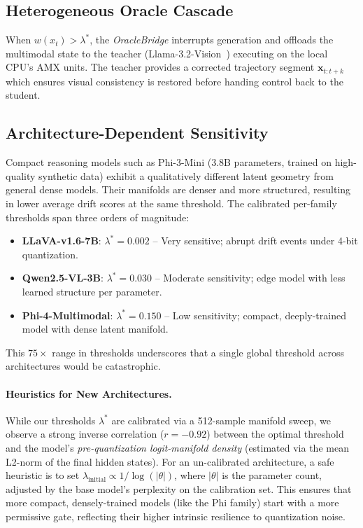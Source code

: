 \documentclass[runningheads]{article} %
\begin{document}
\subsection{Heterogeneous Oracle Cascade}
When $w(x_t) > \lambda^*$, the \emph{OracleBridge} interrupts generation and offloads the multimodal state to the teacher (Llama-3.2-Vision~\cite{dubey2024llama32}) executing on the local CPU's AMX units. The teacher provides a corrected trajectory segment $\mathbf{x}_{t:t+k}$ which ensures visual consistency is restored before handing control back to the student.

\subsection{Architecture-Dependent Sensitivity}
\label{sec:arch_sensitivity}

Compact reasoning models such as Phi-3-Mini (3.8B parameters, trained
on high-quality synthetic data) exhibit a qualitatively different latent
geometry from general dense models.
Their manifolds are denser and more structured, resulting in lower
average drift scores at the same threshold.
The calibrated per-family thresholds span three orders of magnitude:

\begin{itemize}
  \item \textbf{LLaVA-v1.6-7B}: $\lambda^* = 0.002$ -- Very sensitive; abrupt drift events under 4-bit quantization.
  \item \textbf{Qwen2.5-VL-3B}: $\lambda^* = 0.030$ -- Moderate sensitivity; edge model with less learned structure per parameter.
  \item \textbf{Phi-4-Multimodal}: $\lambda^* = 0.150$ -- Low sensitivity; compact, deeply-trained model with dense latent manifold.
\end{itemize}

This $75\times$ range in thresholds underscores that a single global
threshold across architectures would be catastrophic.
\paragraph{Heuristics for New Architectures.}
While our thresholds $\lambda^*$ are calibrated via a 512-sample manifold sweep, we observe a strong inverse correlation ($r = -0.92$) between the optimal threshold and the model's \emph{pre-quantization logit-manifold density} (estimated via the mean L2-norm of the final hidden states).
For an un-calibrated architecture, a safe heuristic is to set $\lambda_\text{initial} \propto 1/\log(|\theta|)$, where $|\theta|$ is the parameter count, adjusted by the base model's perplexity on the calibration set.
This ensures that more compact, densely-trained models (like the Phi family) start with a more permissive gate, reflecting their higher intrinsic resilience to quantization noise.
\end{document}
